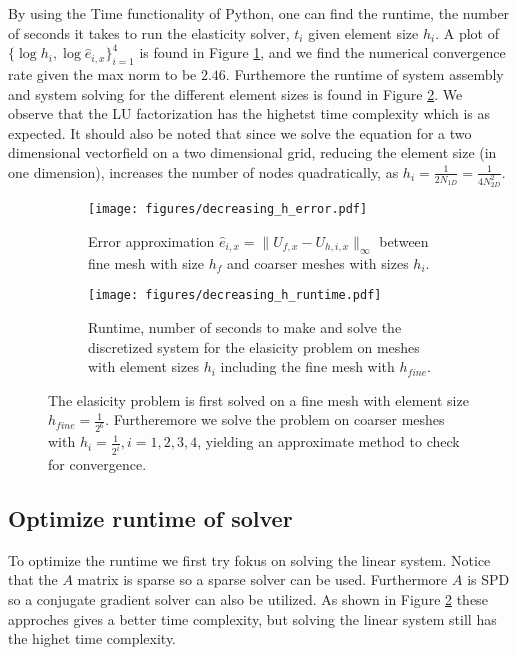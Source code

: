 \documentclass[5pt,a4paper,english]{elsarticle}%
\begin{document}
By using the Time functionality of Python, one can find the runtime, the number of seconds it takes to run the elasticity solver, $t_i$ given element size $h_i$. A plot of $\{\log h_i,\log \hat e_{i,x}\}_{i=1}^4$ is found in Figure \ref{error-convergence-elastic}, and we find the numerical convergence rate given the max norm to be $2.46$. Furthemore the runtime of system assembly and system solving for the different element sizes is found in Figure \ref{time-convergence-elastic}. We observe that the LU factorization has the highetst time complexity which is as expected. It should also be noted that since we solve the equation for a two dimensional vectorfield on a two dimensional grid, reducing the element size (in one dimension), increases the number of nodes quadratically, as $h_i = \frac{1}{2N_{1D}} = \frac{1}{4N_{2D}^2}$.

\begin{figure}[t]
    \begin{subfigure}[t]{0.5\linewidth}
            \centering
                \texttt{[image: figures/decreasing\_h\_error.pdf]}
            \caption{Error approximation $\hat e_{i,x} = \|U_{f,x} - U_{h,i,x}\|_{\infty}$ between fine mesh with size $h_f$ and coarser meshes with sizes $h_i$.}
            \label{error-convergence-elastic}
        \end{subfigure}\qquad
        \begin{subfigure}[t]{0.5\linewidth}
            \centering
                \texttt{[image: figures/decreasing\_h\_runtime.pdf]}
            \caption{Runtime, number of seconds to make and solve the discretized system for the elasicity problem on meshes with element sizes $h_i$ including the fine mesh with $h_{fine}.$ }
            \label{time-convergence-elastic}
        \end{subfigure}
        \label{fig-convergence-elastic}
        \caption{The elasicity problem is first solved on a fine mesh with element size $h_{fine} = \frac{1}{2^6}$. Furtheremore we solve the problem on coarser meshes with $h_i = \frac{1}{2^i}, i = 1,2,3,4$, yielding an approximate method to check for convergence.}
    \end{figure}


\subsection{Optimize runtime of solver}

To optimize the runtime we first try fokus on solving the linear system. Notice that the $A$ matrix is sparse so a sparse solver can be used. Furthermore $A$ is SPD so a conjugate gradient solver can also be utilized. As shown in Figure \ref{time-convergence-elastic} these approches gives a better time complexity, but solving the linear system still has the highet time complexity. 
 
\end{document}
